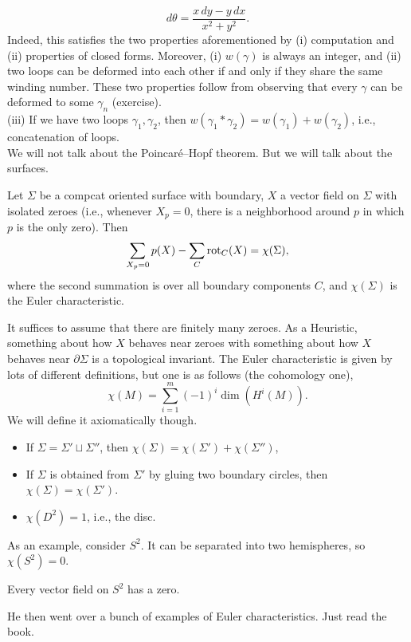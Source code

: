 \[ d\theta = \frac{x \, dy - y \, dx}{x^2 + y^2}. \]
Indeed, this satisfies the two properties aforementioned by (i) computation and (ii) properties of closed forms. Moreover, (i) $w(\gamma)$ is always an integer, and (ii) two loops can be deformed into each other if and only if they share the same winding number. These two properties follow from observing that every $\gamma$ can be deformed to some $\gamma_n$ (exercise).
\\[8pt]
(iii) If we have two loops $\gamma_1, \gamma_2$, then $w(\gamma_1 \ast \gamma_2) = w(\gamma_1) + w(\gamma_2)$, i.e., concatenation of loops.
\\[8PT]
We will not talk about the Poincar\'e--Hopf theorem. But we will talk about the surfaces.
\begin{theorem}[\S8.37]
    Let $\Sigma$ be a compcat oriented surface with boundary, $X$ a vector field on $\Sigma$ with isolated zeroes (i.e., whenever $X_p = 0$, there is a neighborhood around $p$ in which $p$ is the only zero). Then
    \[ \sum_{X_p = 0} \index_p(X) - \sum_{C} \opname{rot}_C(X) = \chi(\Sigma), \]
    where the second summation is over all boundary components $C$, and $\chi(\Sigma)$ is the Euler characteristic.
\end{theorem}
It suffices to assume that there are finitely many zeroes. As a Heuristic, something about how $X$ behaves near zeroes with something about how $X$ behaves near $\partial \Sigma$ is a topological invariant. The Euler characteristic is given by lots of different definitions, but one is as follows (the cohomology one),
\[ \chi(M) = \sum_{i=1}^m (-1)^i \dim(H^i(M)). \]
We will define it axiomatically though.
\begin{itemize}
    \item If $\Sigma = \Sigma' \sqcup \Sigma''$, then $\chi(\Sigma) = \chi(\Sigma') + \chi(\Sigma'')$,
    \item If $\Sigma$ is obtained from $\Sigma'$ by gluing two boundary circles, then $\chi(\Sigma) = \chi(\Sigma')$.
    \item $\chi(D^2) = 1$, i.e., the disc.
\end{itemize}
As an example, consider $S^2$. It can be separated into two hemispheres, so $\chi(S^2) = 0$.
\begin{corollary}
    Every vector field on $S^2$ has a zero.
\end{corollary}
He then went over a bunch of examples of Euler characteristics. Just read the book.